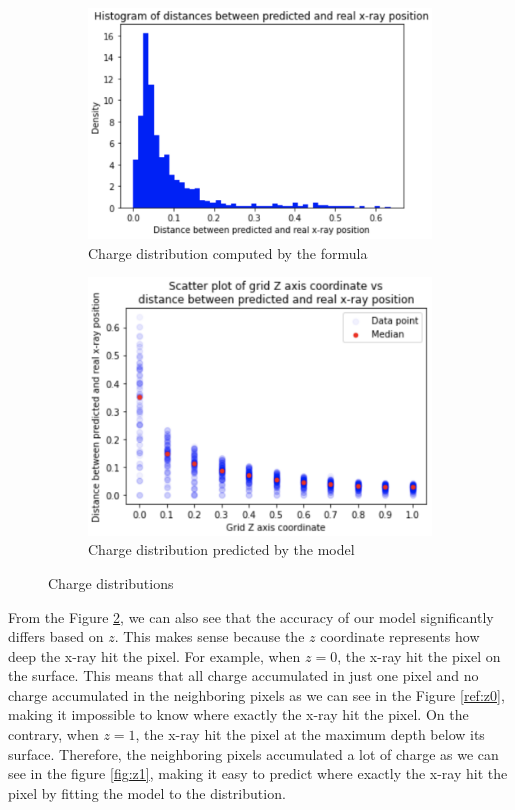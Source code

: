 \documentclass{article}
\begin{document}
\begin{figure}[H]
\centering
\begin{subfigure}{.5\textwidth}
  \centering
  \includegraphics[width=.9\linewidth]{images/theoretical1.png}
  \caption{Charge distribution computed by the formula}
  \label{fig:accuracy1}
\end{subfigure}%
\begin{subfigure}{.5\textwidth}
  \centering
  \includegraphics[width=.8\linewidth]{images/theoretical2.png}
  \caption{Charge distribution predicted by the model}
  \label{fig:accuracy2}
\end{subfigure}
\caption{Charge distributions}
\label{fig:accuracy}
\end{figure}

From the Figure \ref{fig:accuracy2}, we can also see that the accuracy of our model significantly differs based on $z$. This makes sense because the $z$ coordinate represents how deep the x-ray hit the pixel. For example, when $z=0$, the x-ray hit the pixel on the surface. This means that all charge accumulated in just one pixel and no charge accumulated in the neighboring pixels as we can see in the Figure \ref{ref:z0}, making it impossible to know where exactly the x-ray hit the pixel. On the contrary, when $z=1$, the x-ray hit the pixel at the maximum depth below its surface. Therefore, the neighboring pixels accumulated a lot of charge as we can see in the figure \ref{fig:z1}, making it easy to predict where exactly the x-ray hit the pixel by fitting the model to the distribution.
\end{document}
